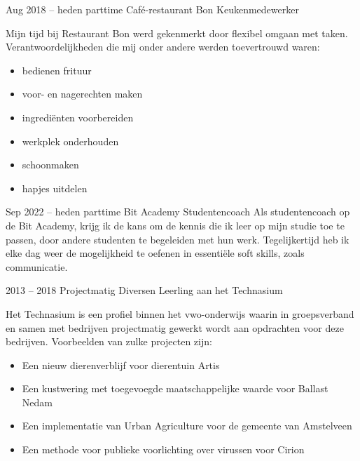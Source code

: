 \documentclass[
	10pt, %
]{FreemanCV}
\begin{document}
\begin{paracol}{2}
	\jobentry
	{Aug 2018 -- heden} %
	{parttime} %
	{Café-restaurant Bon} %
	{Keukenmedewerker} %
	{Mijn tijd bij Restaurant Bon werd gekenmerkt door flexibel omgaan met
	    taken. Verantwoordelijkheden die mij onder andere werden
	    toevertrouwd waren:
		\begin{itemize}
			\item bedienen frituur
			\item voor- en nagerechten maken
			\item ingrediënten voorbereiden
			\item werkplek onderhouden
			\item schoonmaken
			\item hapjes uitdelen
		\end{itemize}
	} %

	\jobentry
	{Sep 2022 -- heden} %
	{parttime} %
	{Bit Academy} %
	{Studentencoach} %
	{Als studentencoach op de Bit Academy, krijg ik de kans om de kennis
	    die ik leer op mijn studie toe te passen, door andere studenten te
	    begeleiden met hun werk. Tegelijkertijd heb ik elke dag weer de
	    mogelijkheid te oefenen in essentiële soft skills, zoals
	    communicatie.
	} %

	\jobentry
	{2013 -- 2018} %
	{Projectmatig} %
	{Diversen} %
	{Leerling aan het Technasium} %
	{Het Technasium is een profiel binnen het vwo-onderwijs waarin in
	    groepsverband en samen met bedrijven projectmatig gewerkt wordt aan
	    opdrachten voor deze bedrijven. Voorbeelden van zulke projecten zijn:
		\raggedright
		\begin{itemize}
			\item Een nieuw dierenverblijf voor dierentuin Artis
			\item Een kustwering met toegevoegde maatschappelijke waarde voor Ballast Nedam
			\item Een implementatie van Urban Agriculture voor de gemeente van Amstelveen
			\item Een methode voor publieke voorlichting over virussen voor Cirion
		\end{itemize}
	} %



\end{paracol}
\end{document}
